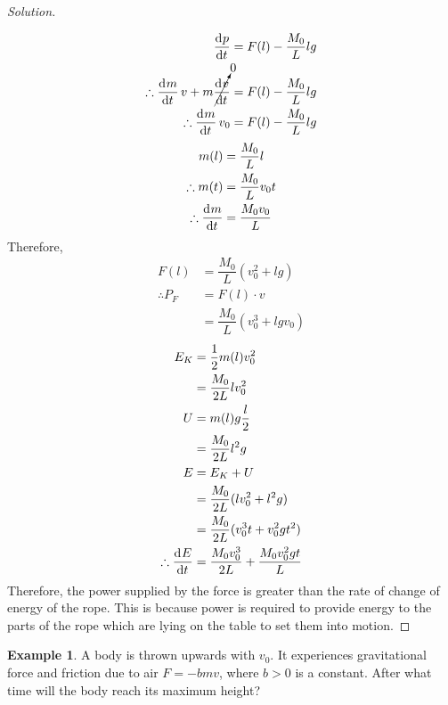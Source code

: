 \documentclass[fleqn, a4paper, 12pt, draft]{article}
\theoremstyle{definition}
\newtheorem{example}{Example}
\theoremstyle{theorem}
\newenvironment{solution}
{\begin{proof}[Solution]\let\qed\relax}
	{\end{proof}}
\begin{document}
\begin{solution}
\begin{figure}[h]
	\end{figure}
	\begin{align*}
		\dod{p}{t}&= F(l) - \dfrac{M_0}{L} l g\\
		\therefore \dod{m}{t} v + m \cancelto{0}{\dod{v}{t}} &= F(l) - \dfrac{M_0}{L} l g\\
		\therefore \dod{m}{t} v_0 &= F(l) - \dfrac{M_0}{L} l g
	\end{align*}
	\begin{align*}
		m(l) &= \dfrac{M_0}{L} l\\
		\therefore m(t) &= \dfrac{M_0}{L} v_0 t\\
		\therefore \dod{m}{t} &= \dfrac{M_0 v_0}{L}
	\end{align*}
	Therefore,
	\begin{align*}
		F(l) &= \dfrac{M_0}{L} (v_0^2 + l g)\\
		\therefore P_F &= F(l) \cdot v\\
		&= \dfrac{M_0}{L} (v_0^3 + l g v_0)
	\end{align*}
	\begin{align*}
		E_K	&= \dfrac{1}{2} m(l) v_0^2\\
		&= \dfrac{M_0}{2L} l v_0^2\\
		U &= m(l) g \dfrac{l}{2}\\
		&= \dfrac{M_0}{2L} l^2 g\\
		E &= E_K + U\\
		&= \dfrac{M_0}{2L} (l v_0^2 + l^2 g)\\
		&= \dfrac{M_0}{2L} (v_0^3 t + v_0^2 g t^2)\\
		\therefore \dod{E}{t} &= \dfrac{M_0 v_0^3}{2L} + \dfrac{M_0 v_0^2 g t}{L}
	\end{align*}
	Therefore, the power supplied by the force is greater than the rate of change of energy of the rope. This is because power is required to provide energy to the parts of the rope which are lying on the table to set them into motion.
\end{solution}

\begin{example}
	A body is thrown upwards with $v_0$. It experiences gravitational force and friction due to air $F = - b m v$, where $b > 0$ is a constant. After what time will the body reach its maximum height?
\end{example}
\end{document}
